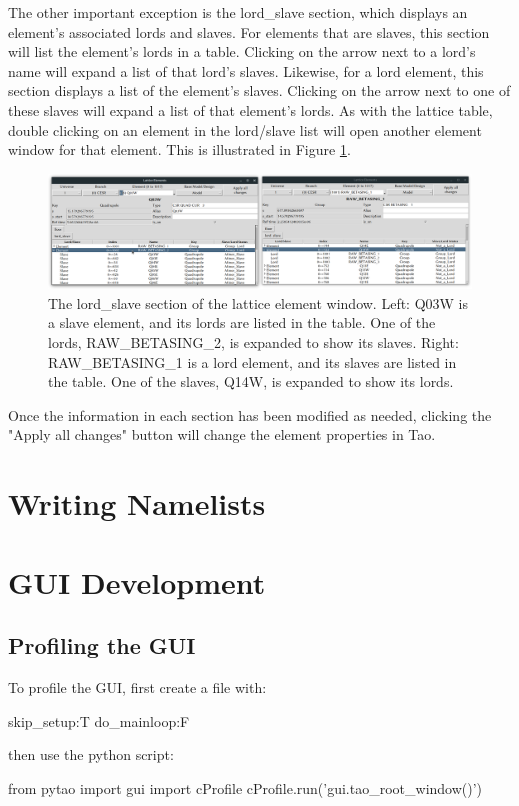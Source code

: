 The other important exception is the lord_slave section, which displays an element's associated lords and slaves.
For elements that are slaves, this section will list the element's lords in a table.
Clicking on the arrow next to a lord's name will expand a list of that lord's slaves.
Likewise, for a lord element, this section displays a list of the element's slaves.
Clicking on the arrow next to one of these slaves will expand a list of that element's lords.
As with the lattice table, double clicking on an element in the lord/slave list will open another element window for that element.
This is illustrated in Figure \ref{fig:gui.lat.element.lordslave}.
\begin{figure}
\centering
\includegraphics[width=12cm]{figures/lat_lord_slave.png}
\caption{The lord_slave section of the lattice element window.
Left: Q03W is a slave element, and its lords are listed in the table.
One of the lords, RAW_BETASING_2, is expanded to show its slaves.
Right: RAW_BETASING_1 is a lord element, and its slaves are listed in the table.
One of the slaves, Q14W, is expanded to show its lords.}
\label{fig:gui.lat.element.lordslave}
\end{figure}

Once the information in each section has been modified as needed, clicking the "Apply all changes" button will change the element properties in Tao.


\section{Writing Namelists}
\label{s:gui.namelist}


\section{GUI Development} 
\label{s:develop}

\subsection{Profiling the GUI} 
\label{s:prfile}

To profile the GUI, first create a  file with:
\begin{example}
  skip_setup:T
  do_mainloop:F
\end{example}

then use the python script:
\begin{example}
  from pytao import gui
  import cProfile
  cProfile.run('gui.tao_root_window()')
\end{example}


